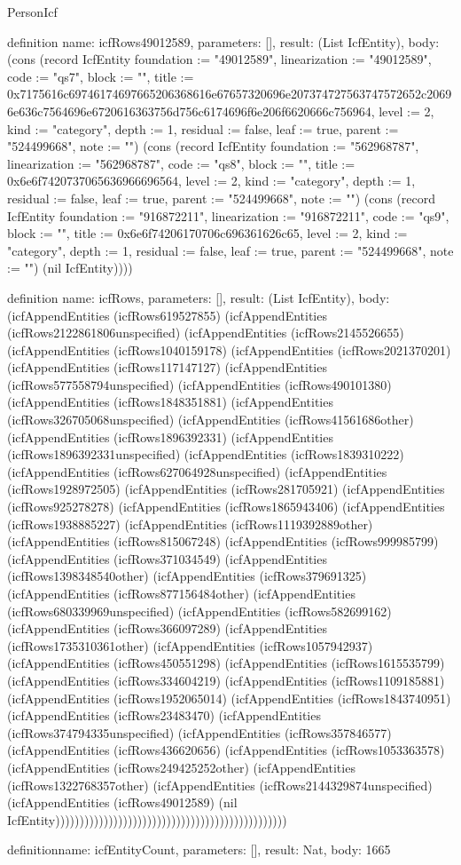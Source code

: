 \begin{lexlean}{PersonIcf}
\begin{semanticmodule}
definition{
  name: icfRows49012589,
  parameters: [],
  result: (List IcfEntity),
  body: (cons (record IcfEntity {foundation := "49012589", linearization := "49012589", code := "qs7", block := "", title := 0x7175616c69746174697665206368616e67657320696e207374727563747572652c20696e636c7564696e6720616363756d756c6174696f6e206f6620666c756964, level := 2, kind := "category", depth := 1, residual := false, leaf := true, parent := "524499668", note := ""}) (cons (record IcfEntity {foundation := "562968787", linearization := "562968787", code := "qs8", block := "", title := 0x6e6f7420737065636966696564, level := 2, kind := "category", depth := 1, residual := false, leaf := true, parent := "524499668", note := ""}) (cons (record IcfEntity {foundation := "916872211", linearization := "916872211", code := "qs9", block := "", title := 0x6e6f74206170706c696361626c65, level := 2, kind := "category", depth := 1, residual := false, leaf := true, parent := "524499668", note := ""}) (nil IcfEntity))))
}

definition{
  name: icfRows,
  parameters: [],
  result: (List IcfEntity),
  body: (icfAppendEntities (icfRows619527855) (icfAppendEntities (icfRows2122861806unspecified) (icfAppendEntities (icfRows2145526655) (icfAppendEntities (icfRows1040159178) (icfAppendEntities (icfRows2021370201) (icfAppendEntities (icfRows117147127) (icfAppendEntities (icfRows577558794unspecified) (icfAppendEntities (icfRows490101380) (icfAppendEntities (icfRows1848351881) (icfAppendEntities (icfRows326705068unspecified) (icfAppendEntities (icfRows41561686other) (icfAppendEntities (icfRows1896392331) (icfAppendEntities (icfRows1896392331unspecified) (icfAppendEntities (icfRows1839310222) (icfAppendEntities (icfRows627064928unspecified) (icfAppendEntities (icfRows1928972505) (icfAppendEntities (icfRows281705921) (icfAppendEntities (icfRows925278278) (icfAppendEntities (icfRows1865943406) (icfAppendEntities (icfRows1938885227) (icfAppendEntities (icfRows1119392889other) (icfAppendEntities (icfRows815067248) (icfAppendEntities (icfRows999985799) (icfAppendEntities (icfRows371034549) (icfAppendEntities (icfRows1398348540other) (icfAppendEntities (icfRows379691325) (icfAppendEntities (icfRows877156484other) (icfAppendEntities (icfRows680339969unspecified) (icfAppendEntities (icfRows582699162) (icfAppendEntities (icfRows366097289) (icfAppendEntities (icfRows1735310361other) (icfAppendEntities (icfRows1057942937) (icfAppendEntities (icfRows450551298) (icfAppendEntities (icfRows1615535799) (icfAppendEntities (icfRows334604219) (icfAppendEntities (icfRows1109185881) (icfAppendEntities (icfRows1952065014) (icfAppendEntities (icfRows1843740951) (icfAppendEntities (icfRows23483470) (icfAppendEntities (icfRows374794335unspecified) (icfAppendEntities (icfRows357846577) (icfAppendEntities (icfRows436620656) (icfAppendEntities (icfRows1053363578) (icfAppendEntities (icfRows249425252other) (icfAppendEntities (icfRows1322768357other) (icfAppendEntities (icfRows2144329874unspecified) (icfAppendEntities (icfRows49012589) (nil IcfEntity))))))))))))))))))))))))))))))))))))))))))))))))
}

definition{name: icfEntityCount, parameters: [], result: Nat, body: 1665}
\end{semanticmodule}
\end{lexlean}
